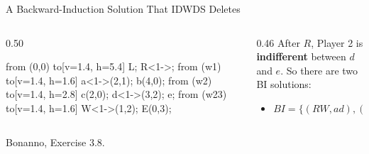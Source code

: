 \begin{frame}{A Backward-Induction Solution That IDWDS Deletes}
\begin{columns}[c]
\begin{column}{0.50\textwidth}
\centering
\begin{gametree}[labels=short, scale=0.66]
  \branch[player=1, root=w, label=90] from (0,0) to[v=1.4, h=5.4] {L; R<1->};
  \branch[player=2, label=135] from (w1) to[v=1.4, h=1.6] {a<1->(2,1); b(4,0)};
  \branch[label=45] from (w2) to[v=1.4, h=2.8] {c(2,0); d<1->(3,2); e};
  \branch[player=1, label=45] from (w23) to[v=1.4, h=1.6] {W<1->(1,2); E(0,3)};
\end{gametree}
\end{column}
\begin{column}{0.46\textwidth}
\small
After $R$, Player 2 is \textbf{indifferent} between $d$ and $e$. So there are two BI solutions:
\begin{itemize}
    \item $BI = \{(RW,ad),(LW,ae)\}$
\end{itemize}
\medskip
{}
\medskip
{}
\medskip
{}
\end{column}
\end{columns}
\vfill
{\footnotesize Bonanno, Exercise 3.8.}
\vspace{-0.2in}
\end{frame}

